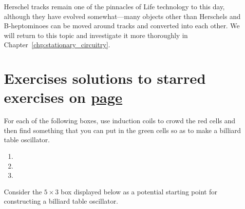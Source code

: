 Herschel tracks remain one of the pinnacles of Life technology to this day, although they have evolved somewhat---many objects other than Herschels and B-heptominoes can be moved around tracks and converted into each other. We will return to this topic and investigate it more thoroughly in Chapter~\ref{chp:stationary_circuitry}.


\filbreak


\section*{Exercises \hfill \normalfont\textsf{\small solutions to starred exercises on \hyperlink{solutions_oscillators}{page \pageref{solutions_oscillators}}}}
\label{sec:oscillators_exercises}
\vspace*{-0.4cm}\hrulefill\vspace*{-0.3cm}\footnotesize\begin{multicols}{2}\vspace*{-0.4cm}\raggedcolumns{}
	\setlength{\parskip}{0pt}
	
	\begin{problemstar}\label{exer:billiard_tables} 
		For each of the following boxes, use induction coils to crowd the red cells and then find something that you can put in the green cells so as to make a billiard table oscillator.\vspace*{-0.25cm}
		
		\begin{multicols}{2}
			\begin{enumerate}
				\item[\bf\color{ocre}(a)] 
				
				\item[\bf\color{ocre}(c)] 
				
				\item[\bf\color{ocre}(b)] 
			\end{enumerate}
		\end{multicols}
	\end{problemstar}
	
	
	\mfilbreak
	
	
	\begin{problem}\label{exer:billiard_table_5x3} 
		Consider the $5 \times 3$ box displayed below as a potential starting point for constructing a billiard table oscillator.
		

\end{problem}
\end{multicols}
